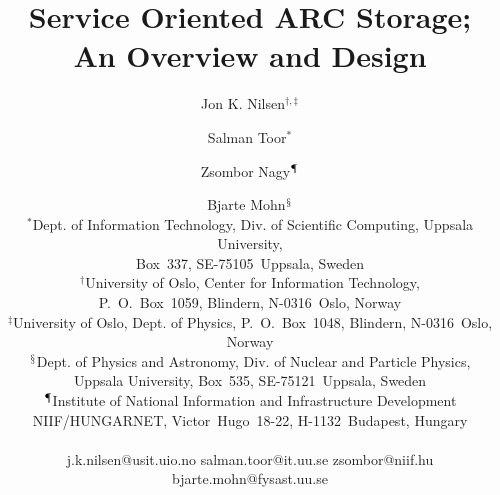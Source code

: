 \documentclass[final]{ieee}
\begin{document}
\pagestyle{headings} 
\title{Service Oriented ARC Storage; \\An Overview and Design}
\author{  Jon K. Nilsen$^{\dagger,\ddagger}$ \and Salman Toor$^{*}$
  \and Zsombor Nagy$^{\mathparagraph}$ \and Bjarte Mohn$^{\mathsection}$ 
\\$^{*}$Dept. of Information Technology, Div. of Scientific Computing, Uppsala
University,\\ Box~337, SE-75105~Uppsala, Sweden
 \\ $^{\dagger}$University of Oslo, Center for Information Technology,\\
P.~O.~Box~1059, Blindern, N-0316~Oslo, Norway
  \\ $^{\ddagger}$University of Oslo, Dept. of Physics, P.~O.~Box~1048,
Blindern, N-0316~Oslo, Norway
  \\  $^{\mathsection}$Dept. of Physics and Astronomy, Div. of Nuclear and
Particle Physics,\\ Uppsala University, Box~535, SE-75121~Uppsala, Sweden \\
$^{\mathparagraph}$Institute of National Information and Infrastructure
Development\\ NIIF/HUNGARNET, Victor~Hugo~18-22, H-1132~Budapest, Hungary\\ \\ 
j.k.nilsen@usit.uio.no \hspace{5 mm}
  salman.toor@it.uu.se \hspace{5 mm} zsombor@niif.hu \\  \hspace{7 mm}
  bjarte.mohn@fysast.uu.se}
  
\end{document}
